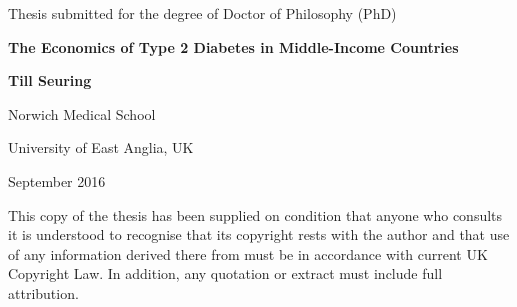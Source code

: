 
\RequirePackage[normalem]{ulem} %
\RequirePackage{color} %
\providecommand{\DIFadd}[1]{{\protect\color{blue}\uwave{#1}}} %
\providecommand{\DIFdel}[1]{{\protect\color{red}\sout{#1}}}                      %
\providecommand{\DIFaddbegin}{} %
\providecommand{\DIFaddend}{} %
\providecommand{\DIFdelbegin}{} %
\providecommand{\DIFdelend}{} %
\providecommand{\DIFaddFL}[1]{\DIFadd{#1}} %
\providecommand{\DIFdelFL}[1]{\DIFdel{#1}} %
\providecommand{\DIFaddbeginFL}{} %
\providecommand{\DIFaddendFL}{} %
\providecommand{\DIFdelbeginFL}{} %
\providecommand{\DIFdelendFL}{} %


%
\date{\today}
\makeatletter
\begin{titlepage}
\centering
\vfill
Thesis submitted for the degree of Doctor of Philosophy (PhD)
\par
\vspace*{1in}
\begin{Large}\bfseries
The Economics of Type 2 Diabetes in Middle-Income Countries\par
\end{Large}
\vspace{1in}
\begin{large}\bfseries
Till Seuring\par
\end{large}
\par
\vspace{0.2in}
Norwich Medical School
\par
University of East Anglia, UK
\par
\vspace{1.0in}
September 2016
\par
\vspace{2.0in}
This copy of the thesis has been supplied on condition that anyone who consults it is
understood to recognise that its copyright rests with the author and that use of any
information derived there from must be in accordance with current UK Copyright Law.
In addition, any quotation or extract must include full attribution.
\end{titlepage}
\makeatother

